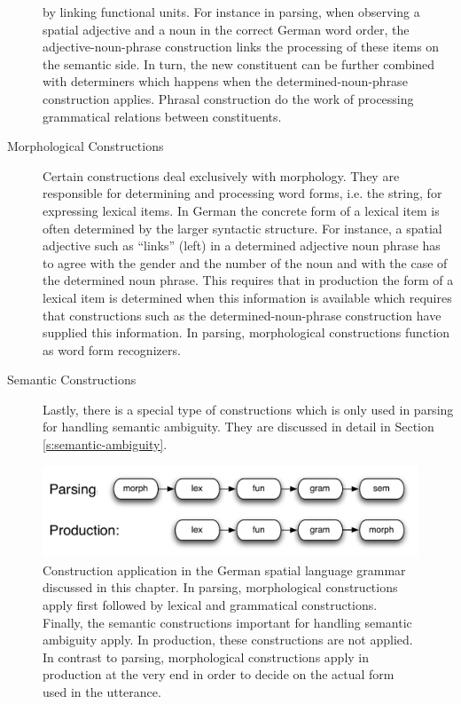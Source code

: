 \begin{description}
by linking functional units. For instance in parsing, when observing
a spatial adjective and a noun in the correct German word order, the adjective-noun-phrase
construction links the processing of these items on the semantic side.
In turn, the new constituent can be further combined with determiners which
happens when the determined-noun-phrase construction applies.
Phrasal construction do the work of processing grammatical
relations between constituents. 
\item[Morphological Constructions] Certain constructions deal
exclusively with morphology. They are responsible for determining and 
processing word forms, i.e. the string, for expressing lexical items. In German
the concrete form of a lexical item is often determined by the larger
syntactic structure. For instance, a spatial adjective such as ``links'' (left) in
a determined adjective noun phrase has to agree with the gender and the number
of the noun and with the case of the determined noun phrase. This requires 
that in production the form of a lexical item is determined when this information
is available which requires that constructions such as the determined-noun-phrase
construction have supplied this information. In parsing, morphological constructions
function as word form recognizers.
\item[Semantic Constructions] Lastly, there is a special type of constructions 
which is only used in parsing for handling semantic ambiguity. They are 
discussed in detail in Section \ref{s:semantic-ambiguity}.
\end{description}


\begin{figure}
\begin{center}
\includegraphics[width=1.0\columnwidth]{figs/cxn-application}
\end{center}
\caption[Construction application]{
Construction application in the German spatial language 
grammar discussed in this chapter. In parsing,
morphological constructions apply first followed by lexical and 
grammatical constructions. Finally, the semantic constructions
important for handling semantic ambiguity apply. In 
production, these constructions are 
not applied. In contrast to parsing, morphological constructions apply in 
production at the very end in order to decide on the actual 
form used in the utterance.}
\label{f:construction-application}
\end{figure}

